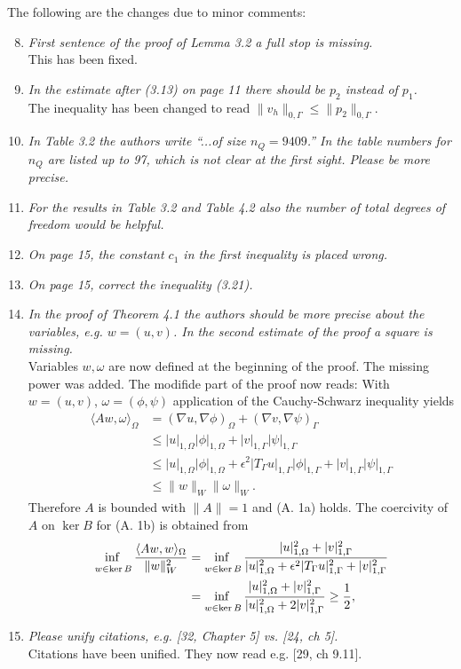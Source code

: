 \documentclass[10pt, a4paper]{article}
\makeatletter
\newcommand{\norm}[1]{\lVert#1\rVert}
\renewcommand{\brack}[1]{\langle#1\rangle}
\newcommand{\inner}[2]{\ensuremath{\left(#1, #2\right)}}
\newcommand{\HnormO}[1]{\lvert#1\rvert_{1, \Omega}}
\newcommand{\HnormG}[1]{\lvert#1\rvert_{1, \Gamma}}
\renewcommand{\inf}{\mathop{\@inf\vphantom{\@sup}}}
\newcommand{\@inf}{\operatorname*{inf}}
\newcommand{\@sup}{\operatorname*{sup}}
\makeatother
\begin{document}
The following are the changes due to minor comments:

\begin{enumerate}
\setcounter{enumi}{7}
  \item{\textit{First sentence of the proof of Lemma 3.2 a full stop is missing.}\\
    This has been fixed.
}
  \item{\textit{In the estimate after (3.13) on page 11 there should be $p_2$
    instead of $p_1$.}\\
    The inequality has been changed to read $\norm{v_h}_{0, \Gamma}\leq
    \norm{p_2}_{0, \Gamma}$.
}
  \item{\textit{In Table 3.2 the authors write ``...of size $n_Q=9409$.'' In the
    table numbers for $n_Q$ are listed up to 97, which is not clear at the first
    sight. Please be more precise.}
}
  \item{\textit{For the results in Table 3.2 and Table 4.2 also the number of
    total degrees of freedom would be helpful.}
}
  \item{\textit{On page 15, the constant $c_1$ in the first inequality is placed
    wrong.}
}
  \item{\textit{On page 15, correct the inequality (3.21).}
}
  \item{\textit{In the proof of Theorem 4.1 the authors should be more precise
    about the variables, e.g. $w=(u, v)$. In the second estimate of the proof a
    square is missing.}\\
    Variables $w, \omega$ are now defined at the beginning of the proof. The
    missing power was added. The modifide part of the proof now reads:
    With $w=(u, v)$, $\omega=(\phi, \psi)$ application of the Cauchy-Schwarz 
  inequality yields
  \[
    \begin{split}
      \brack{A w, \omega }_{\Omega} &= \inner{\nabla u }{\nabla \phi}_{\Omega} + 
      \inner{\nabla v}{\nabla \psi}_{\Gamma}
      \\
      & \leq \HnormO{u}\HnormO{\phi} + \HnormG{v}\HnormG{\psi}
      \\
      & \leq \HnormO{u}\HnormO{\phi} + \epsilon^2\HnormG{T_{\Gamma}
      u}\HnormG{\phi} + \HnormG{v}\HnormG{\psi}
      \\
      & \leq \norm{w}_W\norm{\omega}_W.
  \end{split}
  \]
Therefore $A$ is bounded with $\norm{A}=1$ and (A. 1a) holds. The coercivity of 
$A$ on $\ker B$ for (A. 1b) is obtained from
  \[
  \begin{split}
  \inf_{w\in \ker B}\frac{\brack{Aw, w}_{\Omega}}{\norm{w}^2_W} &=
  \inf_{w\in \ker B}\frac{\HnormO{u}^2 + \HnormG{v}^2}
  {
  \HnormO{u}^2+\epsilon^2\HnormG{T_\Gamma u}^2+\HnormG{v}^2
  }
  \\
  &=
  \inf_{w\in \ker B}\frac{\HnormO{u}^2+\HnormG{v}^2}
  {\HnormO{u}^2 + 2\HnormG{v}^2} \geq \frac{1}{2},
  \end{split}
  \]
}
  \item{\textit{Please unify citations, e.g. [32, Chapter 5] vs. [24, ch 5].}\\
    Citations have been unified. They now read e.g. [29, ch 9.11].
}
\end{enumerate}
\end{document}

